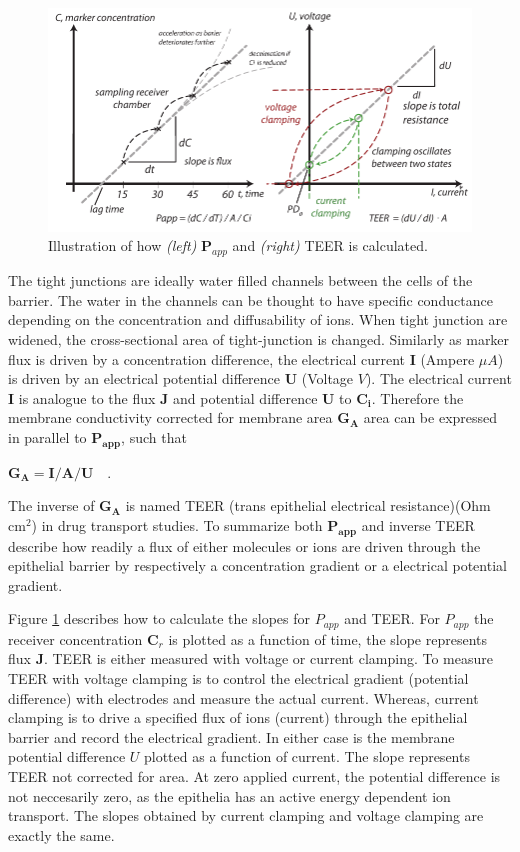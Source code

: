 \begin{figure}[!htpb]
\includegraphics[width=\textwidth,height=\textheight,keepaspectratio]{graphics/samplingClamping.pdf}
\caption{Illustration of how \textit{(left)} $\bm{P}_{app}$ and \textit{(right)} TEER is calculated.}
\label{meassure_TEERPapp}
\end{figure}

The tight junctions are ideally water filled channels between the cells of the barrier. The water in the channels can be thought to have specific conductance depending on the concentration and diffusability of ions. When tight junction are widened, the cross-sectional area of tight-junction is changed. Similarly as marker flux is driven by a concentration difference, the electrical current $\bm{I}$ (Ampere $\mu A$) is driven by an electrical potential difference $\bm{U}$ (Voltage $V$). The electrical current $\bm{I}$ is analogue to the flux $\bm{J}$ and potential difference $\bm{U}$ to $\bm{C_i}$. Therefore the membrane conductivity corrected for membrane area $\bm{G_A}$ area can be expressed in parallel to $\bm{P_{app}}$, such that

$\bm{G_A} = \bm{I} / \bm{A} / \bm{U} \quad .$

The inverse of $\bm{G_A}$ is named TEER (trans epithelial electrical resistance)(Ohm cm$^2$) in drug transport studies. To summarize both $\bm{P_{app}}$ and inverse TEER describe how readily a flux of either molecules or ions are driven through the epithelial barrier by respectively a concentration gradient or a electrical potential gradient. 

Figure \ref{meassure_TEERPapp} describes how to calculate the slopes for $P_{app}$ and TEER. For $P_{app}$  the receiver concentration $\bm{C}_r$ is plotted as a function of time, the slope represents flux $\bm{J}$. TEER is either measured with voltage or current clamping. To measure TEER with voltage clamping is to control the electrical gradient (potential difference) with electrodes and measure the actual current. Whereas, current clamping is to drive a specified flux of ions (current) through the epithelial barrier and record the electrical gradient. In either case is the membrane potential difference $U$ plotted as a function of current. The slope represents TEER not corrected for area. At zero applied current, the potential difference is not neccesarily zero, as the epithelia has an active energy dependent ion transport. The slopes obtained by current clamping and voltage clamping are exactly the same.

